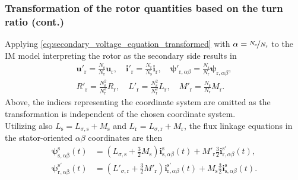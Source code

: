 \begin{frame}
	\frametitle{Transformation of the rotor quantities based on the turn ratio (cont.)}
    Applying \eqref{eq:secondary_voltage_equation_transformed} with $\alpha=\nicefrac{N_\mathrm{s}}{N_\mathrm{r}}$ to the IM model  interpreting the rotor as the secondary side results in
    \begin{equation}
        \begin{gathered}
        \bm{u}'_{\mathrm{r}} = \frac{N_\mathrm{s}}{N_\mathrm{r}}\bm{u}_{\mathrm{r}}, \quad \bm{i}'_{\mathrm{r}} = \frac{N_\mathrm{r}}{N_\mathrm{s}}\bm{i}_{\mathrm{r}}, \quad \bm{\psi}'_{\mathrm{r},\alpha\beta} = \frac{N_\mathrm{s}}{N_\mathrm{r}}\bm{\psi}_{\mathrm{r},\alpha\beta},\\
        R'_\mathrm{r} =  \frac{N_\mathrm{s}^2}{N_\mathrm{r}^2} R_\mathrm{r}, \quad L'_\mathrm{r} =  \frac{N_\mathrm{s}^2}{N_\mathrm{r}^2} L_\mathrm{r}, \quad M'_\mathrm{r} =  \frac{N_\mathrm{s}}{N_\mathrm{r}} M_\mathrm{r}.
    \end{gathered}
    \end{equation}
    Above, the indices representing the coordinate system are omitted as the transformation is independent of the chosen coordinate system. 
    \\[0.5em]
    Utilizing also $L_\mathrm{s} = L_{\sigma,\mathrm{s}} + M_\mathrm{s}$ and $L_\mathrm{r} = L_{\sigma,\mathrm{r}} + M_\mathrm{r}$, the flux linkage equations in the stator-oriented $\alpha\beta$ coordinates are then
    \begin{align*}
        \bm{\psi}^\mathrm{s}_\mathrm{s,\alpha\beta}(t) &= (L_{\sigma,\mathrm{s}} +\frac{3}{2}M_\mathrm{s}) \bm{i}^\mathrm{s}_{\mathrm{s},\alpha\beta}(t) +  M'_{\mathrm{r}}\frac{3}{2} \bm{i}^{\mathrm{s}'}_{\mathrm{r},\alpha\beta}(t),\\
        \bm{\psi}^{\mathrm{s}'}_\mathrm{r,\alpha\beta}(t) &= (L'_{\sigma,\mathrm{r}} + \frac{3}{2}M'_\mathrm{r}) \bm{i}^{\mathrm{s}'}_{\mathrm{r},\alpha\beta}(t) +  M_{\mathrm{s}}\frac{3}{2} \bm{i}^\mathrm{s}_{\mathrm{s},\alpha\beta}(t).
    \end{align*}
\end{frame}

